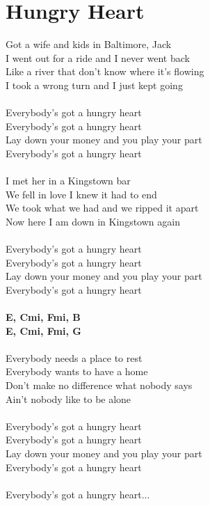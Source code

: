 \section{Hungry Heart}
Got a wife and kids in Baltimore, Jack\\
I went out for a ride and I never went back\\
Like a river that don't know where it's flowing\\
I took a wrong turn and I just kept going\\
\\
Everybody's got a hungry heart\\
Everybody's got a hungry heart\\
Lay down your money and you play your part\\
Everybody's got a hungry heart\\
\\
I met her in a Kingstown bar\\
We fell in love I knew it had to end\\
We took what we had and we ripped it apart\\
Now here I am down in Kingstown again\\
\\
Everybody's got a hungry heart\\
Everybody's got a hungry heart\\
Lay down your money and you play your part\\
Everybody's got a hungry heart\\
\\
\footnotesize\textbf{E\be , Cmi, Fmi, B\be}\\
\textbf{E\be , Cmi, Fmi, G}\\
\\
\normalsize
{}Everybody needs a place to rest\\
Everybody wants to have a home\\
Don't make no difference what nobody says\\
Ain't nobody like to be alone\\
\\
Everybody's got a hungry heart\\
Everybody's got a hungry heart\\
Lay down your money and you play your part\\
Everybody's got a hungry heart\\
\\
Everybody's got a hungry heart...\\
